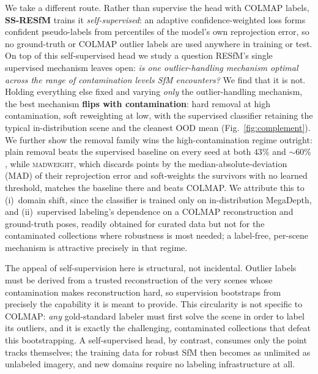 \documentclass[10pt,twocolumn,letterpaper]{article}
\newcommand{\mad}{\textsc{madweight}}
\begin{document}
We take a different route. Rather than supervise the head with COLMAP labels, \textbf{SS-RESfM}
trains it \emph{self-supervised}: an adaptive confidence-weighted loss forms confident
pseudo-labels from percentiles of the model's own reprojection error, so no ground-truth or
COLMAP outlier labels are used anywhere in training or test. On top of this self-supervised
head we study a question RESfM's single supervised mechanism leaves open: \emph{is one
outlier-handling mechanism optimal across the range of contamination levels SfM encounters?}
We find that it is not. Holding everything else fixed and varying \emph{only} the
outlier-handling mechanism, the best mechanism \textbf{flips with contamination}:
hard removal at high contamination, soft reweighting at low, with the supervised
classifier retaining the typical in-distribution scene and the cleanest OOD mean
(Fig.~\ref{fig:complement}).
We further show the removal family wins the high-contamination regime outright: plain
removal beats the supervised baseline on every seed at both $43\%$ and $\sim\!60\%$,
while \mad{}, which discards points by the median-absolute-deviation (MAD) of their
reprojection error and soft-weights the survivors with no learned threshold, matches the
baseline there and beats COLMAP. We attribute this to
(i)~domain shift, since the classifier is trained only on in-distribution MegaDepth, and
(ii)~supervised labeling's dependence on a COLMAP reconstruction and ground-truth poses,
readily obtained for curated data but not for the contaminated collections where
robustness is most needed; a label-free, per-scene mechanism is attractive precisely
in that regime.

The appeal of self-supervision here is structural, not incidental. Outlier labels must be
derived from a trusted reconstruction of the very scenes whose contamination makes
reconstruction hard, so supervision bootstraps from precisely the capability it is meant
to provide. This circularity is not specific to COLMAP: \emph{any} gold-standard labeler
must first solve the scene in order to label its outliers, and it is exactly the
challenging, contaminated collections that defeat this bootstrapping. A self-supervised
head, by contrast, consumes only the point tracks themselves; the training data for robust
SfM then becomes as unlimited as unlabeled imagery, and new domains require no labeling
infrastructure at all.
\end{document}
